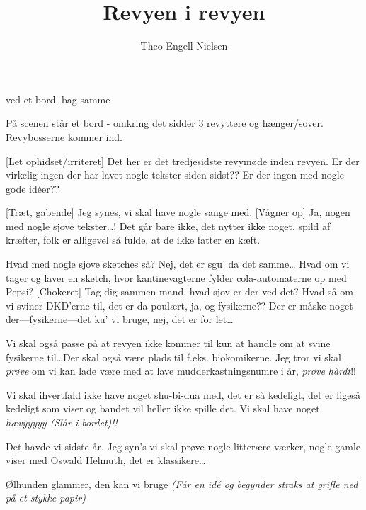 \documentclass[10pt]{article}
\title{Revyen i revyen}
\author{Theo Engell-Nielsen}
\begin{document}
\maketitle

\begin{sketch}

\begin{roles}
   ved et bord.
   bag samme
\end{roles}

\scene På scenen står et bord - omkring det sidder 3 revyttere og
hænger/sover. Revybosserne kommer ind.

 [Let ophidset/irriteret] Det her er det tredjesidste
revymøde inden revyen. Er der virkelig ingen der har lavet nogle tekster siden
sidst?? Er der ingen med nogle gode id\'eer??

[Træt, gabende] Jeg synes, vi skal have nogle sange med.
[Vågner op] Ja, nogen med nogle sjove tekster\ldots!
 Det går bare ikke, det nytter ikke noget, spild af kræfter, folk er alligevel så fulde, at de ikke fatter en kæft. 

 Hvad med nogle sjove sketches så?
 Nej, det er sgu' da det samme\ldots
{} Hvad om vi tager og laver en sketch, hvor kantinevagterne
fylder cola-automaterne op med Pepsi?
 [Chokeret] Tag dig sammen mand, hvad sjov er der ved det?
 Hvad så om vi sviner DKD'erne til, det er da poulært, ja, og
fysikerne??
 Der er måske noget der---fysikerne---det ku' vi bruge, nej, det
er for let\ldots

 Vi skal også passe på at revyen ikke kommer til kun at
handle om at svine fysikerne til\ldots Der skal også være plads til
f.eks. biokomikerne. Jeg tror vi skal {\em prøve} om vi kan lade være med
at lave mudderkastningsnumre i år, {\em prøve hårdt}!!

 Vi skal ihvertfald ikke have noget shu-bi-dua med, det er så
kedeligt, det er ligeså kedeligt som viser og bandet vil heller ikke spille
det. Vi skal have noget {\em hævyyyyy (Slår i bordet)!!}

 Det havde vi sidste år. Jeg syn's vi skal prøve nogle
litterære værker, nogle gamle viser med Oswald Helmuth, det er klassikere\ldots

 Ølhunden glammer, den kan vi bruge {\em (Får en id\'e og
  begynder straks at grifle ned på et stykke papir)}


\end{sketch}
\end{document}
